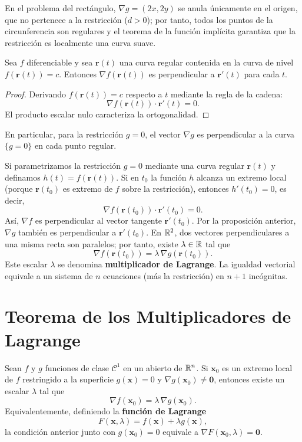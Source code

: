 En el problema del rectángulo, $\nabla g=(2x,2y)$ se anula únicamente en el origen, que no pertenece a la restricción ($d>0$); por tanto, todos los puntos de la circunferencia son regulares y el teorema de la función implícita garantiza que la restricción es localmente una curva suave.

\begin{prop}
Sea $f$ diferenciable y sea $\mathbf{r}(t)$ una curva regular contenida en la curva de nivel $f(\mathbf{r}(t))=c$. Entonces $\nabla f(\mathbf{r}(t))$ es perpendicular a $\mathbf{r}'(t)$ para cada $t$.
\end{prop}

\begin{proof}
Derivando $f(\mathbf{r}(t))=c$ respecto a $t$ mediante la regla de la cadena:
\[
\nabla f(\mathbf{r}(t))\cdot \mathbf{r}'(t)=0.
\]
El producto escalar nulo caracteriza la ortogonalidad.
\end{proof}

En particular, para la restricción $g=0$, el vector $\nabla g$ es perpendicular a la curva $\{g=0\}$ en cada punto regular.

Si parametrizamos la restricción $g=0$ mediante una curva regular $\mathbf{r}(t)$ y definamos $h(t)=f(\mathbf{r}(t))$. Si en $t_0$ la función $h$ alcanza un extremo local (porque $\mathbf{r}(t_0)$ es extremo de $f$ sobre la restricción), entonces $h'(t_0)=0$, es decir,
\[
\nabla f(\mathbf{r}(t_0))\cdot \mathbf{r}'(t_0)=0.
\]
Así, $\nabla f$ es perpendicular al vector tangente $\mathbf{r}'(t_0)$. Por la proposición anterior, $\nabla g$ también es perpendicular a $\mathbf{r}'(t_0)$. En ${\mathbb R}^2$, dos vectores perpendiculares a una misma recta son paralelos; por tanto, existe $\lambda\in{\mathbb R}$ tal que
\[
\nabla f(\mathbf{r}(t_0)) = \lambda\,\nabla g(\mathbf{r}(t_0)).
\]
Este escalar $\lambda$ se denomina \textbf{multiplicador de Lagrange}. La igualdad vectorial equivale a un sistema de $n$ ecuaciones (más la restricción) en $n+1$ incógnitas.

\section{Teorema de los Multiplicadores de Lagrange}

\begin{theorem}
Sean $f$ y $g$ funciones de clase $\mathcal C^1$ en un abierto de ${\mathbb R}^n$. Si $\mathbf{x}_0$ es un extremo local de $f$ restringido a la superficie $g(\mathbf{x})=0$ y $\nabla g(\mathbf{x}_0)\neq \mathbf{0}$, entonces existe un escalar $\lambda$ tal que
\[
\nabla f(\mathbf{x}_0) = \lambda\,\nabla g(\mathbf{x}_0).
\]
Equivalentemente, definiendo la \textbf{función de Lagrange}
\[
F(\mathbf{x},\lambda)=f(\mathbf{x})+\lambda g(\mathbf{x}),
\]
la condición anterior junto con $g(\mathbf{x}_0)=0$ equivale a $\nabla F(\mathbf{x}_0,\lambda)=\mathbf{0}$.
\end{theorem}

